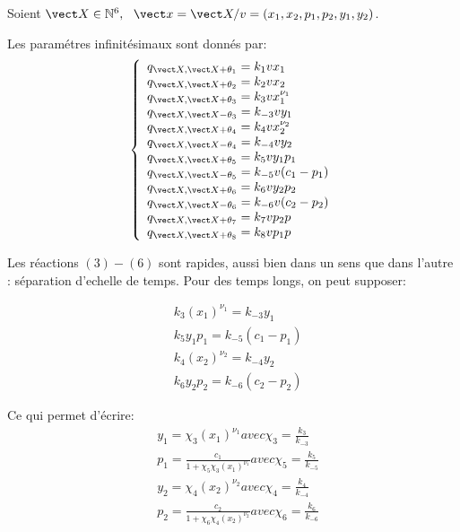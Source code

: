 \documentclass{article}
\begin{document}
Soient  $\vect X \in \mathbb{N}^6, ~~\vect x=\vect X/v=(x_1,x_2,p_1,p_2,y_1,y_2)$.

Les param{\'e}tres infinit{\'e}simaux sont donn{\'e}s par:
\[
  \left \{
 \begin{array}{l}
q_{\vect X,\vect X +\theta_1}  =  k_1vx_1 \\
q_{\vect X,\vect X +\theta_2}  = k_{2}vx_2 \\
q_{\vect X ,\vect X +\theta_3} = k_3vx_1^{\nu_1} \\
q_{\vect X ,\vect X -\theta_3} = k_{-3}vy_1  \\
q_{\vect X ,\vect X +\theta_4}  = k_{4}vx_2^{\nu_2} \\
q_{\vect X ,\vect X -\theta_4}  = k_{-4}vy_2 \\
q_{\vect X ,\vect X +\theta_5}  = k_5vy_1p_1 \\
q_{\vect X ,\vect X -\theta_5} = k_{-5}v(c_1-p_1) \\
q_{\vect X ,\vect X +\theta_6}  = k_6vy_2p_2 \\
q_{\vect X ,\vect X -\theta_6} = k_{-6}v(c_2-p_2) \\
q_{\vect X ,\vect X +\theta_7}  = k_7vp_2p \\
q_{\vect X ,\vect X +\theta_8} = k_{8}vp_1p
\end{array} \right.
\]



Les r{\'e}actions $(3)-(6)$ sont rapides, aussi bien dans un sens que
dans l'autre : s{\'e}paration d'echelle de temps. Pour des temps
longs, on peut supposer:

\[
\begin{split}
& k_3(x_1)^{\nu_1} = k_{-3}y_1 \\
& k_5y_1p_1 = k_{-5}(c_1-p_1) \\
& k_4(x_2)^{\nu_2} = k_{-4}y_2 \\
& k_6y_2p_2 =  k_{-6}(c_2-p_2)
\end{split}
\]



Ce qui permet d'{\'e}crire:
\[
\begin{split}
& y_1= \chi_3(x_1)^{\nu_1} avec \chi_3 = \frac{k_3}{k_{-3}} \\
& p_1=\frac{c_1}{1+\chi_5\chi_3(x_1)^{\nu_1}}avec  \chi_5 = \frac{k_5}{k_{-5}} \\
& y_2 = \chi_4(x_2)^{\nu_2} avec \chi_4 = \frac{k_4}{k_{-4}} \\
& p_2=\frac{c_2}{1+\chi_6\chi_4(x_2)^{\nu_2}} avec  \chi_6 = \frac{k_6}{k_{-6}}
\end{split}
\]
\end{document}
